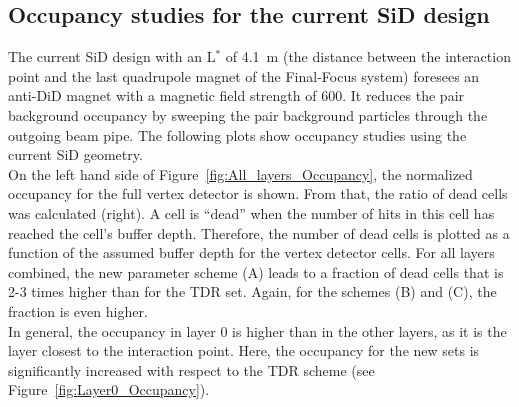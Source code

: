 \subsection{Occupancy studies for the current SiD design}
The current SiD design with an L$^*$ of \SI{4.1}{\meter} (the distance between the interaction point and the last quadrupole magnet of the Final-Focus system) foresees an anti-DiD magnet with a magnetic field strength of \SI{600}{\gauss}.
It reduces the pair background occupancy by sweeping the pair background particles through the outgoing beam pipe.
The following plots show occupancy studies using the current SiD geometry.\\
On the left hand side of Figure~\ref{fig:All_layers_Occupancy}, the normalized occupancy for the full vertex detector is shown.
From that, the ratio of dead cells was calculated (right).
A cell is ``dead'' when the number of hits in this cell has reached the cell's buffer depth.
Therefore, the number of dead cells is plotted as a function of the assumed buffer depth for the vertex detector cells.
For all layers combined, the new parameter scheme (A) leads to a fraction of dead cells that is 2-3 times higher than for the TDR set.
Again, for the schemes (B) and (C), the fraction is even higher.
\\In general, the occupancy in layer 0 is higher than in the other layers, as it is the layer closest to the interaction point.
Here, the occupancy for the new sets is significantly increased with respect to the TDR scheme (see Figure~\ref{fig:Layer0_Occupancy}). 
